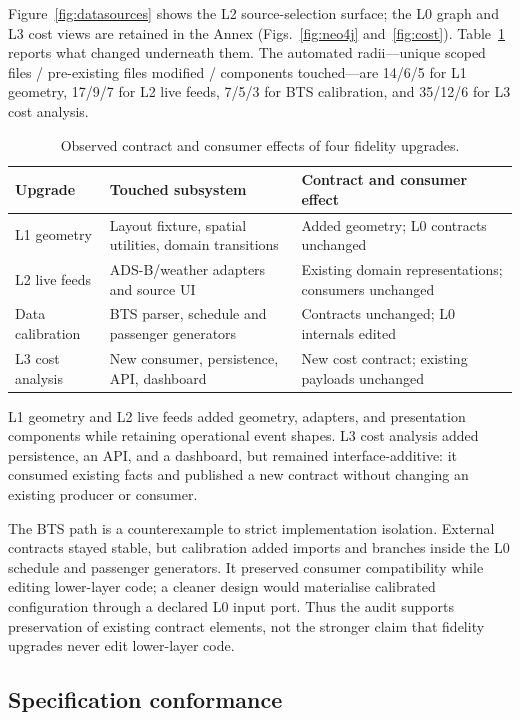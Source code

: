 \documentclass[runningheads]{llncs}
\begin{document}
Figure~\ref{fig:datasources} shows the L2 source-selection surface; the L0 graph and L3 cost views are retained in the Annex (Figs.~\ref{fig:neo4j} and~\ref{fig:cost}). Table~\ref{tab:upgrades} reports what changed underneath them. The automated radii---unique scoped files / pre-existing files modified / components touched---are 14/6/5 for L1 geometry, 17/9/7 for L2 live feeds, 7/5/3 for BTS calibration, and 35/12/6 for L3 cost analysis.

\begin{table}[t]
\centering
\small
\caption{Observed contract and consumer effects of four fidelity upgrades.}
\label{tab:upgrades}
\begin{tabular}{p{}p{}p{}}
\hline
Upgrade & Touched subsystem & Contract and consumer effect \\
\hline
L1 geometry & Layout fixture, spatial utilities, domain transitions & Added geometry; L0 contracts unchanged \\
L2 live feeds & ADS-B/weather adapters and source UI & Existing domain representations; consumers unchanged \\
Data calibration & BTS parser, schedule and passenger generators & Contracts unchanged; L0 internals edited \\
L3 cost analysis & New consumer, persistence, API, dashboard & New cost contract; existing payloads unchanged \\
\hline
\end{tabular}
\end{table}

L1 geometry and L2 live feeds added geometry, adapters, and presentation components while retaining operational event shapes. L3 cost analysis added persistence, an API, and a dashboard, but remained interface-additive: it consumed existing facts and published a new contract without changing an existing producer or consumer.

The BTS path is a counterexample to strict implementation isolation. External contracts stayed stable, but calibration added imports and branches inside the L0 schedule and passenger generators. It preserved consumer compatibility while editing lower-layer code; a cleaner design would materialise calibrated configuration through a declared L0 input port. Thus the audit supports preservation of existing contract elements, not the stronger claim that fidelity upgrades never edit lower-layer code.

\subsection{Specification conformance}
\end{document}
